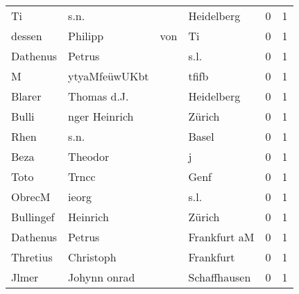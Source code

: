 \begin{tabular}{llllrr}
                       Ti &                               s.n. &             &                                  Heidelberg &          0 &         1 \\
                   dessen &                            Philipp &         von &                                          Ti &          0 &         1 \\
                 Dathenus &                             Petrus &             &                                        s.l. &          0 &         1 \\
                        M &                      ytyaMfeüwUKbt &             &                                       tfifb &          0 &         1 \\
                   Blarer &                        Thomas d.J. &             &                                  Heidelberg &          0 &         1 \\
                    Bulli &                      nger Heinrich &             &                                      Zürich &          0 &         1 \\
                     Rhen &                               s.n. &             &                                       Basel &          0 &         1 \\
                     Beza &                            Theodor &             &                                           j &          0 &         1 \\
                     Toto &                              Trncc &             &                                        Genf &          0 &         1 \\
                   ObrecM &                              ieorg &             &                                        s.l. &          0 &         1 \\
                Bullingef &                           Heinrich &             &                                      Zürich &          0 &         1 \\
                 Dathenus &                             Petrus &             &                                Frankfurt aM &          0 &         1 \\
                 Thretius &                          Christoph &             &                                   Frankfurt &          0 &         1 \\
                    Jlmer &                       Johynn onrad &             &                                Schaffhausen &          0 &         1 \\

\end{tabular}
